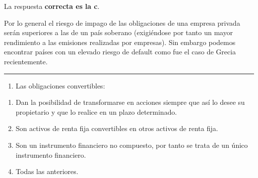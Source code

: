 \documentclass[
  letterpaper,
  DIV=11,
  numbers=noendperiod]{scrreprt}
\providecommand{\tightlist}{%
  \setlength{\itemsep}{0pt}\setlength{\parskip}{0pt}}\usepackage{longtable,booktabs,array}
\begin{document}
\begin{tcolorbox}[enhanced jigsaw, left=2mm, opacityback=0, colback=white, breakable, arc=.35mm, bottomrule=.15mm, rightrule=.15mm, toprule=.15mm, leftrule=.75mm, colframe=quarto-callout-tip-color-frame]
\begin{minipage}[t]{5.5mm}
\textcolor{quarto-callout-tip-color}{\faLightbulb}
\end{minipage}%
\begin{minipage}[t]{\textwidth - 5.5mm}

La respuesta \textbf{correcta es la c}.

Por lo general el riesgo de impago de las obligaciones de una empresa
privada serán superiores a las de un país soberano (exigiéndose por
tanto un mayor rendimiento a las emisiones realizadas por empresas). Sin
embargo podemos encontrar países con un elevado riesgo de default como
fue el caso de Grecia recientemente.

\end{minipage}%
\end{tcolorbox}

\begin{center}\rule{0.5\linewidth}{0.5pt}\end{center}

\begin{enumerate}
\def\labelenumi{\arabic{enumi}.}
\setcounter{enumi}{68}
\tightlist
\item
  Las obligaciones convertibles:
\end{enumerate}

\begin{enumerate}
\def\labelenumi{\alph{enumi})}
\item
  Dan la posibilidad de transformarse en acciones siempre que así lo
  desee su propietario y que lo realice en un plazo determinado.
\item
  Son activos de renta fija convertibles en otros activos de renta fija.
\item
  Son un instrumento financiero no compuesto, por tanto se trata de un
  único instrumento financiero.
\item
  Todas las anteriores.
\end{enumerate}
\end{document}
